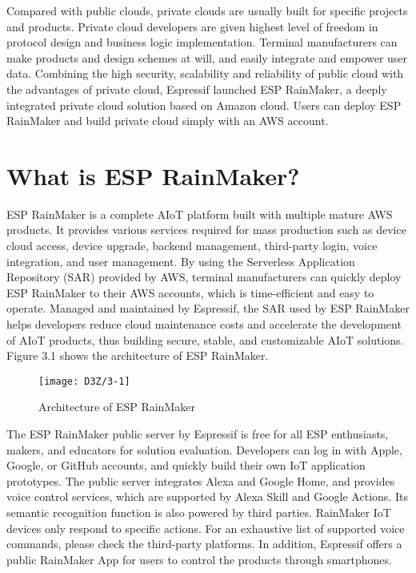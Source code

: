 \documentclass[a4paper,12pt]{book}
\begin{document}
Compared with public clouds, private clouds are usually built for specific projects and products. Private cloud developers are given highest level of freedom in protocol design and business logic implementation. Terminal manufacturers can make products and design schemes at will, and easily integrate and empower user data. Combining the high security, scalability and reliability of public cloud with the advantages of private cloud, Espressif launched ESP RainMaker, a deeply integrated private cloud solution based on Amazon cloud. Users can deploy ESP RainMaker and build private cloud simply with an AWS account.

\section{What is ESP RainMaker?}
ESP RainMaker is a complete AIoT platform built with multiple mature AWS products. It provides various services required for mass production such as device cloud access, device upgrade, backend management, third-party login, voice integration, and user management. By using the Serverless Application Repository (SAR) provided by AWS, terminal manufacturers can quickly deploy ESP RainMaker to their AWS accounts, which is time-efficient and easy to operate. Managed and maintained by Espressif, the SAR used by ESP RainMaker helps developers reduce cloud maintenance costs and accelerate the development of AIoT products, thus building secure, stable, and customizable AIoT solutions. Figure 3.1 shows the architecture of ESP RainMaker.
\begin{figure}[!ht]
    \centering
    \texttt{[image: D3Z/3-1]}
    \caption{Architecture of ESP RainMaker}
\end{figure}

The ESP RainMaker public server by Espressif is free for all ESP enthusiasts, makers, and educators for solution evaluation. Developers can log in with Apple, Google, or GitHub accounts, and quickly build their own IoT application prototypes. The public server integrates Alexa and Google Home, and provides voice control services, which are supported by Alexa Skill and Google Actions. Its semantic recognition function is also powered by third parties. RainMaker IoT devices only respond to specific actions. For an exhaustive list of supported voice commands, please check the third-party platforms. In addition, Espressif offers a public RainMaker App for users to control the products through smartphones.
\end{document}
